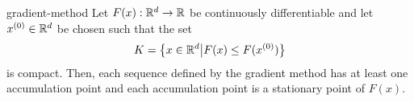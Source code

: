 \begin{Theorem}{gradient-method}
  Let $F(x) : \mathbb R^d \to \mathbb R$ be continuously differentiable and let
  $x^{(0)} \in \mathbb R^d$ be chosen such that the set
  \begin{gather*}
    K = \bigl\{ x\in \mathbb R^d \big| F(x)\le F(x^{(0)}) \bigr\}
  \end{gather*}
  is compact. Then, each sequence defined by the gradient method has
  at least one accumulation point and each accumulation point is a
  stationary point of $F(x)$.
\end{Theorem}
